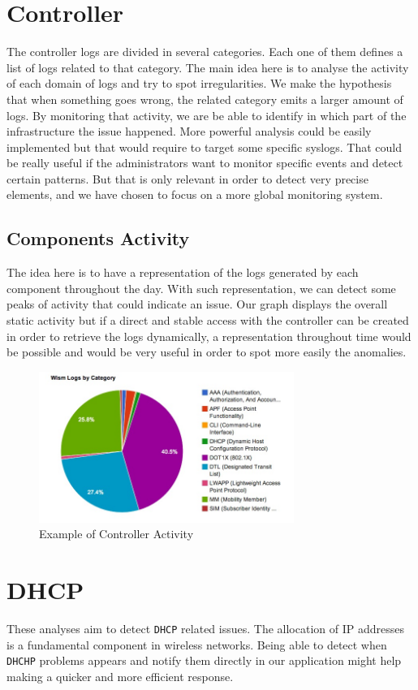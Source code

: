 \section{Controller}
The controller logs are divided in several categories. Each one of them defines a list of logs related to that category. The main idea here is to analyse the activity of each domain of logs and try to spot irregularities. We make the hypothesis that when something goes wrong, the related category emits a larger amount of logs. By monitoring that activity, we are be able to identify in which part of the infrastructure the issue happened. More powerful analysis could be easily implemented but that would require to target some specific syslogs. That could be really useful if the administrators want to monitor specific events and detect certain patterns. But that is only relevant in order to detect very precise elements, and we have chosen to focus on a more global monitoring system.


\subsection{Components Activity}
The idea here is to have a representation of the logs generated by each component throughout the day. With such representation, we can detect some peaks of activity that could indicate an issue. Our graph displays the overall static activity but if a direct and stable access with the controller can be created in order to retrieve the logs dynamically, a representation throughout time would be possible and would be very useful in order to spot more easily the anomalies.

\begin{figure}[H]
	\centering
   \includegraphics[width=0.74\textwidth]{Pictures/chapter5/controller.png}
   \caption{Example of Controller Activity}
\end{figure}

\section{DHCP}
These analyses aim to detect \texttt{DHCP} related issues. The allocation of IP addresses is a fundamental component in wireless networks. Being able to detect when \texttt{DHCHP} problems appears and notify them directly in our application might help making a quicker and more efficient response.

